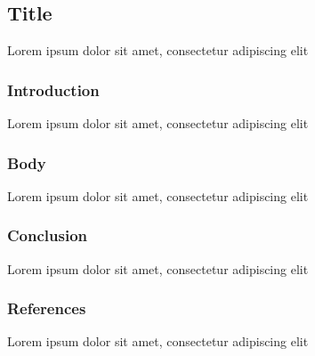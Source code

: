 \documentclass{article}
\begin{document}
\subsection*{Title}
Lorem ipsum dolor sit amet, consectetur adipiscing elit
\subsubsection*{Introduction}
Lorem ipsum dolor sit amet, consectetur adipiscing elit
\subsubsection*{Body}
Lorem ipsum dolor sit amet, consectetur adipiscing elit
\subsubsection*{Conclusion}
Lorem ipsum dolor sit amet, consectetur adipiscing elit
\subsubsection*{References}
Lorem ipsum dolor sit amet, consectetur adipiscing elit
\end{document}
